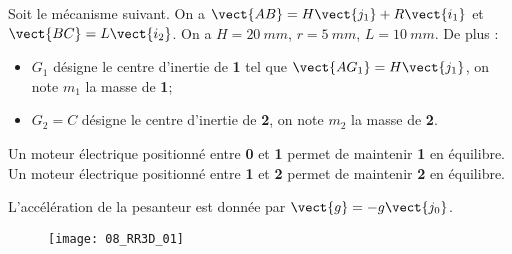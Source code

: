 \normalfalse \difficiletrue \tdifficilefalse
\correctionfalse


\setcounter{question}{0}%

\ifcorrection
\else
{}
\fi

\ifprof
\else
Soit le mécanisme suivant. On a $\vect{AB}=H\vect{j_1}+R\vect{i_1}$ et $\vect{BC}=L\vect{i_2}$. On a $H=\SI{20}{mm}$, $r=\SI{5}{mm}$, $L=\SI{10}{mm}$. De plus :
\begin{itemize}
\item $G_1$ désigne le centre d'inertie de \textbf{1} tel que $\vect{AG_1}=H\vect{j_1}$, on note $m_1$ la masse de \textbf{1};%
\item $G_2=C$ désigne le centre d'inertie de \textbf{2}, on note $m_2$ la masse de \textbf{2}.%
\end{itemize}

Un moteur électrique positionné entre \textbf{0} et \textbf{1} permet de maintenir \textbf{1} en équilibre.
Un moteur électrique positionné entre \textbf{1} et \textbf{2} permet de maintenir \textbf{2} en équilibre.

L'accélération de la pesanteur est donnée par $\vect{g}=-g\vect{j_0}$.

\begin{figure}[!h]
\texttt{[image: 08\_RR3D\_01]}
\end{figure}
\fi

\ifprof
\else
\fi

\ifprof
\else
\fi

\ifprof
\else
\fi
\ifprof
\else


\fi